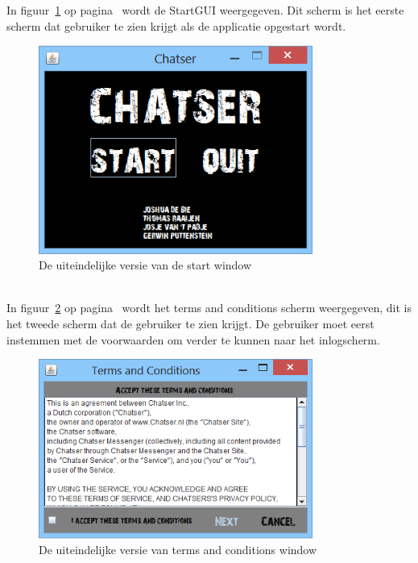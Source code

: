 \documentclass[12pt]{article}
\begin{document}
\noindent In figuur~\ref{figure015} op pagina~\pageref{figure015} wordt de StartGUI weergegeven. Dit scherm is het eerste scherm dat gebruiker te zien krijgt als de applicatie opgestart wordt.
\begin{figure}[!h]
\begin{center}
\includegraphics[width = 90mm]{StartGUI}
\caption{De uiteindelijke versie van de start window}
\label{figure015}
\end{center}
\end{figure}
\\

\noindent In figuur~\ref{figure016} op pagina~\pageref{figure016} wordt het terms and conditions scherm weergegeven, dit is het tweede scherm dat de gebruiker te zien krijgt. De gebruiker moet eerst instemmen met de voorwaarden om verder te kunnen naar het inlogscherm. \newpage

\begin{figure}[!h]
\begin{center}
\includegraphics[width = 90mm]{Terms_Conditions1}
\caption{De uiteindelijke versie van terms and conditions window}
\label{figure016}
\end{center}
\end{figure}

\newpage
\end{document}
